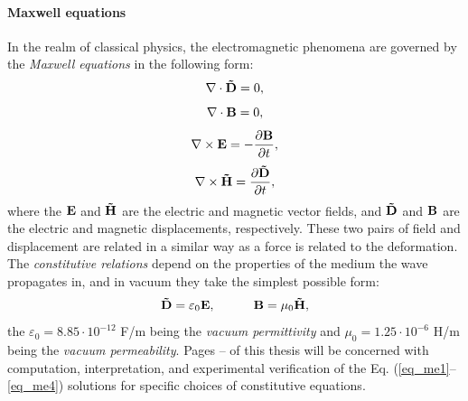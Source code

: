 \paragraph{Maxwell equations} In the realm of classical physics, the electromagnetic phenomena are governed by the \textit{Maxwell equations} in the following form: %
\begin{equation} \nabla \cdot  \mathbf{\tilde{D}} = 0, \label{eq_me1}\end{equation}  
\begin{equation} \nabla \cdot  \mathbf{B} = 0, \label{eq_me2}\end{equation}  
\begin{equation} \nabla \times \mathbf{E} = -\frac{\partial \mathbf{B}} {\partial t}, \label{eq_me3}\end{equation}  
\begin{equation} \nabla \times \mathbf{\tilde{H}} =  \frac{\partial \mathbf{\tilde{D}}} {\partial t}, \label{eq_me4}\end{equation}  
where the $\mathbf{E}$ and $\mathbf{\tilde{H}}$ are the electric and magnetic vector fields, and $\mathbf{\tilde{D}}$ and $\mathbf{B}$ are the electric and magnetic displacements,
 respectively. These two pairs of field and displacement are related in a similar way as a force is related to the deformation. %
 The \textit{constitutive relations} depend on the properties of the medium the wave propagates in, and in vacuum they take the simplest possible form:
\begin{equation}		\mathbf{\tilde{D}} = \varepsilon_0	\mathbf{E}, \quad\quad\quad						\mathbf{B} = \mu_0			\mathbf{\tilde{H}},				 \label{eq_ce}\end{equation}
the $\varepsilon_0 = 8.85\cdot10^{-12}$ F/m being the \textit{vacuum permittivity} and $\mu_0 = 1.25\cdot10^{-6}$ H/m being the \textit{vacuum permeability}. 
Pages \pageref{starttext}--\pageref{endtext} of this thesis will be concerned with computation, interpretation, and experimental verification of the Eq. (\ref{eq_me1}--\ref{eq_me4}) solutions for specific choices of constitutive equations.
\label{starttext}
